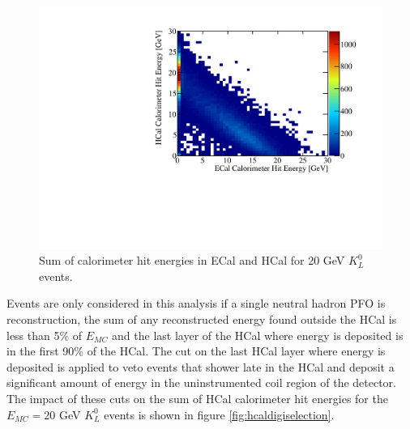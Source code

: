 \begin{figure}
\includegraphics[width=\largefigwidth]{EnergyEstimators/Plots/Calibration/Digitsation/HCal/ECalHCalKaon0LSplit.pdf}
\caption[Sum of calorimeter hit energies in ECal and HCal for 20 GeV $K^{0}_{L}$ events.]{Sum of calorimeter hit energies in ECal and HCal for 20 GeV $K^{0}_{L}$ events.}
\label{fig:hcaldigikaonsplit}
\end{figure}

Events are only considered in this analysis if a single neutral hadron PFO is reconstruction, the sum of any reconstructed energy found outside the HCal is less than 5\% of $E_{MC}$ and the last layer of the HCal where energy is deposited is in the first 90\% of the HCal.  The cut on the last HCal layer where energy is deposited is applied to veto events that shower late in the HCal and deposit a significant amount of energy in the uninstrumented coil region of the detector.  The impact of these cuts on the sum of HCal calorimeter hit energies for the $E_{MC} = 20$ GeV $K^{0}_{L}$ events is shown in figure \ref{fig:hcaldigiselection}.

